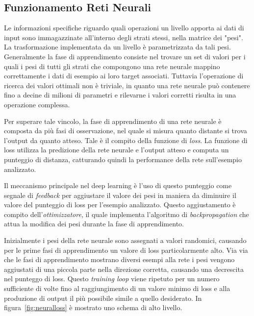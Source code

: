 \subsection{Funzionamento Reti Neurali}
Le informazioni specifiche riguardo quali operazioni un livello apporta ai dati di input sono immagazzinate all'interno degli strati stessi, nella matrice dei "pesi". La trasformazione implementata da un livello è parametrizzata da tali pesi. Generalmente la fase di apprendimento consiste nel trovare un set di valori per i quali i pesi di tutti gli strati che compongono una rete neurale mappino correttamente i dati di esempio ai loro target associati.
Tuttavia l'operazione di ricerca dei valori ottimali non è triviale, in quanto una rete neurale può contenere fino a decine di milioni di parametri e rilevarne i valori corretti risulta in una operazione complessa.

Per superare tale vincolo, la fase di apprendimento di una rete neurale è composta da più fasi di osservazione, nel quale si misura quanto distante si trova l'output da quanto atteso. Tale è il compito della funzione di \textit{loss}. La funzione di loss utilizza la predizione della rete neurale e l'output atteso e computa un punteggio di distanza, catturando quindi la performance della rete sull'esempio analizzato.

Il meccanismo principale nel deep learning è l'uso di questo punteggio come segnale di \textit{feedback} per aggiustare il valore dei pesi in maniera da diminuire il valore del punteggio di loss per l'esempio analizzato. Questo aggiustamento è compito dell'\textit{ottimizzatore}, il quale implementa l'algoritmo di \textit{backpropagation} che attua la modifica dei pesi durante la fase di apprendimento.

Inizialmente i pesi della rete neurale sono assegnati a valori randomici, causando per le prime fasi di apprendimento un valore di loss particolarmente alto. Via via che le fasi di apprendimento mostrano diversi esempi alla rete i pesi vengono aggiustati di una piccola parte nella direzione corretta, causando una decrescita nel punteggo di loss. Questo \textit{training loop} viene ripetuto per un numero sufficiente di volte fino al raggiungimento di un valore minimo di loss e alla produzione di output il più possibile simile a quello desiderato. In figura~\ref{fig:neuralloss} è mostrato uno schema di alto livello.

